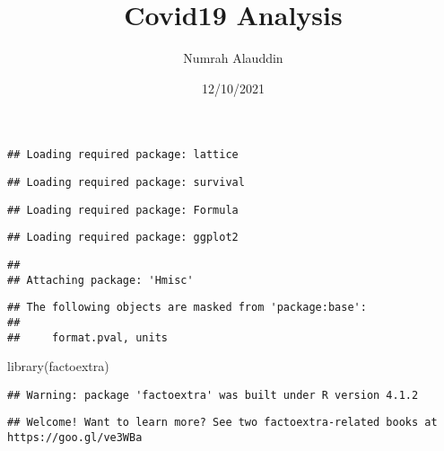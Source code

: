 \documentclass[
]{article}
\title{Covid19 Analysis}
\author{Numrah Alauddin}
\date{12/10/2021}
\newenvironment{Shaded}{\begin{snugshade}}{\end{snugshade}}
\newcommand{\AttributeTok}[1]{\textcolor[rgb]{0.77,0.63,0.00}{#1}}
\newcommand{\CommentTok}[1]{\textcolor[rgb]{0.56,0.35,0.01}{\textit{#1}}}
\newcommand{\ConstantTok}[1]{\textcolor[rgb]{0.00,0.00,0.00}{#1}}
\newcommand{\FunctionTok}[1]{\textcolor[rgb]{0.00,0.00,0.00}{#1}}
\newcommand{\NormalTok}[1]{#1}
\newcommand{\SpecialCharTok}[1]{\textcolor[rgb]{0.00,0.00,0.00}{#1}}
\begin{document}
\maketitle

\begin{Shaded}
\end{Shaded}

\begin{verbatim}
## Loading required package: lattice
\end{verbatim}

\begin{verbatim}
## Loading required package: survival
\end{verbatim}

\begin{verbatim}
## Loading required package: Formula
\end{verbatim}

\begin{verbatim}
## Loading required package: ggplot2
\end{verbatim}

\begin{verbatim}
## 
## Attaching package: 'Hmisc'
\end{verbatim}

\begin{verbatim}
## The following objects are masked from 'package:base':
## 
##     format.pval, units
\end{verbatim}

\begin{Shaded}
\begin{Highlighting}[]
\FunctionTok{library}\NormalTok{(factoextra)}
\end{Highlighting}
\end{Shaded}

\begin{verbatim}
## Warning: package 'factoextra' was built under R version 4.1.2
\end{verbatim}

\begin{verbatim}
## Welcome! Want to learn more? See two factoextra-related books at https://goo.gl/ve3WBa
\end{verbatim}
\end{document}
